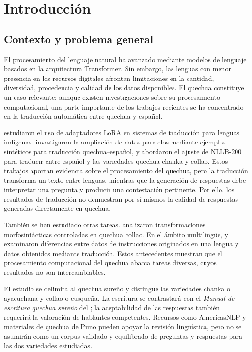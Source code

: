 \clearpage
\chapter{Introducción}\label{introduccion}

\section{Contexto y problema general}\label{contexto-problema-general}

El procesamiento del lenguaje natural ha avanzado mediante modelos de lenguaje basados en la arquitectura Transformer. Sin embargo, las lenguas con menor presencia en los recursos digitales afrontan limitaciones en la cantidad, diversidad, procedencia y calidad de los datos disponibles. El quechua constituye un caso relevante: aunque existen investigaciones sobre su procesamiento computacional, una parte importante de los trabajos recientes se ha concentrado en la traducción automática entre quechua y español.

\textcite{GarciaGilabert2024} estudiaron el uso de adaptadores LoRA en sistemas de traducción para lenguas indígenas. \textcite{AsilloCongora2025} investigaron la ampliación de datos paralelos mediante ejemplos sintéticos para traducción quechua--español, y \textcite{QuispeCallanaupa2026} abordaron el ajuste de NLLB-200 para traducir entre español y las variedades quechua chanka y collao. Estos trabajos aportan evidencia sobre el procesamiento del quechua, pero la traducción transforma un texto entre lenguas, mientras que la generación de respuestas debe interpretar una pregunta y producir una contestación pertinente. Por ello, los resultados de traducción no demuestran por sí mismos la calidad de respuestas generadas directamente en quechua.

También se han estudiado otras tareas. \textcite{PoccoOncevay2026} analizaron transformaciones morfosintácticas controladas en quechua collao. En el ámbito multilingüe, \textcite{Chen2024} y \textcite{Liu2025} examinaron diferencias entre datos de instrucciones originados en una lengua y datos obtenidos mediante traducción. Estos antecedentes muestran que el procesamiento computacional del quechua abarca tareas diversas, cuyos resultados no son intercambiables.

El estudio se delimita al quechua sureño y distingue las variedades chanka o ayacuchana y collao o cusqueña. La escritura se contrastará con el \emph{Manual de escritura quechua sureño} del \textcite{MINEDU2021}; la aceptabilidad de las respuestas también requerirá la valoración de hablantes competentes. Recursos como AmericasNLP y materiales de quechua de Puno pueden apoyar la revisión lingüística, pero no se asumirán como un corpus validado y equilibrado de preguntas y respuestas para las dos variedades estudiadas.

